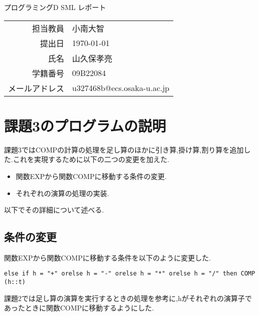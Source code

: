 \documentclass[dvipdfmx]{jarticle}
\begin{document}
\begin{titlepage}
    \begin{center}
        \vspace*{60pt}
        {\LARGE プログラミングD SML レポート}
        \vspace*{240pt}\\
        \begin{tabular}{rl}
            担当教員 & 小南大智\\
            提出日 & \today\\
            氏名 & 山久保孝亮\\
            学籍番号 & 09B22084\\
            メールアドレス & u327468b@ecs.osaka-u.ac.jp
        \end{tabular}
    \end{center}
\end{titlepage}

\section{課題3のプログラムの説明}
課題3ではCOMPの計算の処理を足し算のほかに引き算,掛け算,割り算を追加した.これを実現するために以下の二つの変更を加えた.
\begin{itemize}
    \item 関数EXPから関数COMPに移動する条件の変更.
    \item それぞれの演算の処理の実装.
\end{itemize}
以下でその詳細について述べる.
\subsection{条件の変更}
関数EXPから関数COMPに移動する条件を以下のように変更した.
\begin{lstlisting}[caption=COMPに移動する条件,label=fuga]
    else if h = "+" orelse h = "-" orelse h = "*" orelse h = "/" then COMP (h::t)
\end{lstlisting}
課題2では足し算の演算を実行するときの処理を参考に,hがそれぞれの演算子であったときに関数COMPに移動するようにした.
\end{document}
